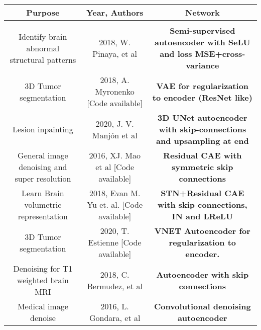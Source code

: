 \begin{table}[!ht]
    \setlength\extrarowheight{2pt} %
    \begin{tabularx}{\textwidth}{C C C}
    \hline
        \textbf{Purpose} & \textbf{Year, Authors} & \textbf{Network} \\
        \hline
        
        \\
        
        \hline
        
        Identify brain abnormal structural patterns & 2018, W. Pinaya, et al \cite{pinaya2019} & \textbf{Semi-supervised autoencoder with SeLU and loss MSE+cross-variance} \\
        
        3D Tumor segmentation & 2018, A. Myronenko \cite{myronenko20183d} [Code available] & \textbf{VAE for regularization to encoder (ResNet like)} \\
        
         Lesion inpainting & 2020, J. V. Manjón et al \cite{2020inpainting} & \textbf{3D UNet autoencoder with skip-connections and upsampling at end} \\
         
         General image denoising and super resolution & 2016, XJ. Mao et al \cite{superresolution} [Code available] & \textbf{Residual CAE with symmetric skip connections} \\
        
        Learn Brain volumetric representation &  2018, Evan  M.  Yu  et.   al. \cite{learnvolrepreCODE} [Code available] & \textbf{STN+Residual CAE with skip connections, IN and LReLU}\\
        
        3D Tumor segmentation & 2020, T. Estienne \cite{otherBraTS2020} [Code available] & \textbf{VNET Autoencoder for regularization to encoder.} \\
        
        Denoising for T1 weighted brain MRI & 2018, C. Bermudez, et al \cite{bermudez2018t1autoencoder} & \textbf{Autoencoder with skip connections} \\
        
        Medical image denoise & 2016, L. Gondara, et al \cite{gondara2016medicalautoencoder} &\textbf{Convolutional denoising autoencoder} \\
        

\end{tabularx}
\end{table}
